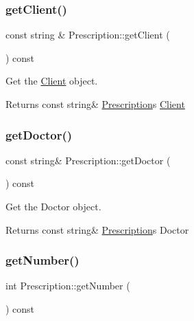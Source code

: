 \subsubsection{\texorpdfstring{get\+Client()}{getClient()}}
{\footnotesize\ttfamily const string \& Prescription\+::get\+Client (\begin{DoxyParamCaption}{ }\end{DoxyParamCaption}) const}



Get the \hyperlink{classClient}{Client} object. 

\begin{DoxyReturn}{Returns}
const string\& \hyperlink{classPrescription}{Prescription}\textquotesingle{}s \hyperlink{classClient}{Client} 
\end{DoxyReturn}
\mbox{\label{classPrescription_aba0ddace1c50e0f708d1f8e427263e0f}} 
\subsubsection{\texorpdfstring{get\+Doctor()}{getDoctor()}}
{\footnotesize\ttfamily const string\& Prescription\+::get\+Doctor (\begin{DoxyParamCaption}{ }\end{DoxyParamCaption}) const}



Get the Doctor object. 

\begin{DoxyReturn}{Returns}
const string\& \hyperlink{classPrescription}{Prescription}\textquotesingle{}s Doctor 
\end{DoxyReturn}
\mbox{\label{classPrescription_a6a89f632894bee1e959973d26f0b4cc8}} 
\subsubsection{\texorpdfstring{get\+Number()}{getNumber()}}
{\footnotesize\ttfamily int Prescription\+::get\+Number (\begin{DoxyParamCaption}{ }\end{DoxyParamCaption}) const}



